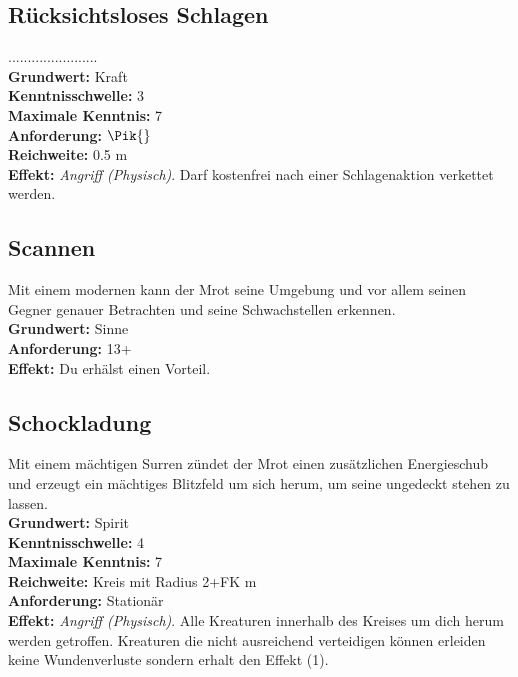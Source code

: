 \subsection*{Rücksichtsloses Schlagen} \label{sk:rücksichtsloses_schlagen}
.......................\\
\textbf{Grundwert:} Kraft \\
\textbf{Kenntnisschwelle:} 3 \\
\textbf{Maximale Kenntnis:} 7 \\
\textbf{Anforderung:} $\Pik{}$\\
\textbf{Reichweite:} 0.5 m\\
\textbf{Effekt:} \textit{Angriff (Physisch)}. Darf kostenfrei nach einer Schlagenaktion verkettet werden.

\subsection*{Scannen} \label{sk:scannen}
Mit einem modernen  kann der Mrot seine Umgebung und vor allem seinen Gegner genauer Betrachten und seine Schwachstellen erkennen.\\
\textbf{Grundwert:} Sinne \\
\textbf{Anforderung:} 13+ \\
\textbf{Effekt:} Du erhälst einen Vorteil.

\subsection*{Schockladung} \label{sk:schockladung}
Mit einem mächtigen Surren zündet der Mrot einen zusätzlichen Energieschub und erzeugt ein mächtiges Blitzfeld um sich herum, um seine ungedeckt stehen zu lassen.\\
\textbf{Grundwert:} Spirit \\
\textbf{Kenntnisschwelle:} 4 \\
\textbf{Maximale Kenntnis:} 7 \\
\textbf{Reichweite:} Kreis mit Radius 2+FK m\\
\textbf{Anforderung:} Stationär\\
\textbf{Effekt:} \textit{Angriff (Physisch)}. Alle Kreaturen innerhalb des Kreises um dich herum werden getroffen. Kreaturen die nicht ausreichend verteidigen können erleiden keine Wundenverluste sondern erhalt den Effekt \textit{} (1).

